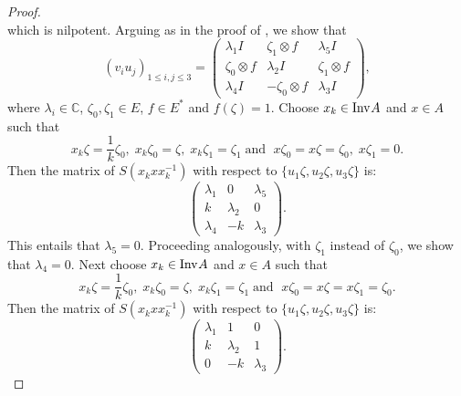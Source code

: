 \documentclass[a4paper,12pt,reqno]{amsart}
\numberwithin{equation}{section}
\theoremstyle{definition}
\begin{document}
\begin{proof}
\begin{equation*}
\end{equation*}
which is nilpotent. Arguing as in the proof of \cite[Theorem 4.1]{NaMa13}, we show that
 \begin{equation*} (v_iu_j)_{1 \leq i,j \leq 3}= \left(\begin{array}{ccc}
                                             \lambda_1 I & \zeta_1 \otimes f & \lambda_5 I\\
                                             \zeta_0 \otimes f & \lambda_2 I & \zeta_1 \otimes f \\
                                             \lambda_4 I & - \zeta_0 \otimes f &\lambda_3 I
                                           \end{array}\right),
\end{equation*}
where $\lambda_i \in {\mathbb{C}}$,  $\zeta_0, \zeta_1 \in E$, $f \in E^*$ and $f(\zeta)=1$.
Choose $x_k \in{{\textup{Inv}\kern.5pt A}}$ and $x \in A$ such that
\begin{equation*}
x_k \zeta= \frac{1}{k} \zeta_0, \; x_k\zeta_0=\zeta,\; x_k\zeta_1=\zeta_1 \;\text {and }\; x\zeta_0= x\zeta=\zeta_0,\; x\zeta_1=0.
\end{equation*}
Then the matrix of ${S} (x_k^{}x x_k^{-1})$ with respect to $\{u_1 \zeta, u_2 \zeta, u_3 \zeta\}$ is:
\[
\left(\begin{array}{ccc}
                                             \lambda_1  &  0  & \lambda_5\\
                                             k  & \lambda_2  & 0  \\
                                             \lambda_4  & - k   &\lambda_3
                                           \end{array}\right).
\]
This entails that $\lambda_5=0$. Proceeding analogously, with $\zeta_1$ instead of $\zeta_0$, we show that $\lambda_4=0$.
Next choose   $x_k\in{{\textup{Inv}\kern.5pt A}}$ and $x\in A$ such that
\[
x_k \zeta= \frac{1}{k} \zeta_0, \; x_k \zeta_0= \zeta, \; x_k \zeta_1= \zeta_1 \; \text {and }\; x \zeta_0= x \zeta =x \zeta_1= \zeta_0.
 \]
Then the matrix of ${S} (x_k^{}x x_k^{-1})$ with respect to $\{u_1 \zeta, u_2 \zeta, u_3 \zeta\}$ is:
\[
\left(\begin{array}{ccc}
                                             \lambda_1  &  1  & 0 \\
                                             k  & \lambda_2  & 1  \\
                                             0 & - k   &\lambda_3
                                           \end{array}\right).
\]
\end{proof}
\end{document}
